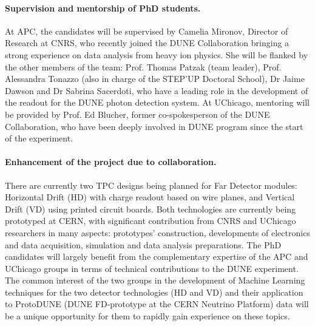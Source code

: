 \paragraph{Supervision and mentorship of PhD students.} At APC, the candidates will be supervised by Camelia Mironov, Director of Research at CNRS, who recently joined the DUNE Collaboration bringing a strong experience on data analysis from heavy ion physics. She will be flanked by the other members of the team: Prof. Thomas Patzak (team leader), Prof. Alessandra Tonazzo (also in charge of the STEP'UP Doctoral School), Dr Jaime Dawson and Dr Sabrina Sacerdoti, who have a leading role in the development of the readout for the DUNE photon detection system. At UChicago, mentoring will be provided by Prof. Ed Blucher, former co-spokesperson of the DUNE Collaboration, who have been deeply involved in DUNE program since the start of the experiment.
\vspace{-0.5cm}
\paragraph{Enhancement of the project due to collaboration.} There are currently two TPC designs being planned for Far Detector modules: Horizontal Drift (HD) with charge readout based on wire planes, and Vertical Drift (VD) using printed circuit boards.  Both technologies are currently being prototyped at CERN, with significant contribution from CNRS and UChicago researchers in many aspects: prototypes' construction, developments of electronics and data acquisition, simulation and data analysis preparations. The PhD candidates will largely benefit from the complementary expertise of the APC and UChicago groups in terms of technical contributions to the DUNE experiment. The common interest of the two groups in the development of Machine Learning techniques for the two detector technologies (HD and VD) and their application to ProtoDUNE (DUNE FD-prototype at the CERN Neutrino Platform) data will be a unique opportunity for them to rapidly gain experience on these topics.
\vspace{-0.5cm}
